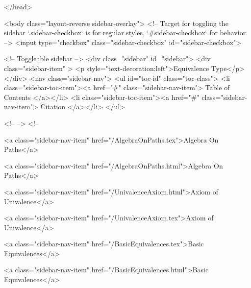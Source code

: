   
</head>




  <body class="layout-reverse sidebar-overlay">
    <!-- Target for toggling the sidebar `.sidebar-checkbox` is for regular
     styles, `#sidebar-checkbox` for behavior. -->
<input type="checkbox" class="sidebar-checkbox" id="sidebar-checkbox">

<!-- Toggleable sidebar -->
<div class="sidebar" id="sidebar">
  <div class="sidebar-item" >
    <p style="text-decoration:left">Equivalence Type</p>
  </div>
  <nav class="sidebar-nav">
    <ul id="toc-id" class="toc-class">
  <li class="sidebar-toc-item"><a href="#" class="sidebar-nav-item"> Table of Contents </a></li>
  <li class="sidebar-toc-item"><a href="#" class="sidebar-nav-item"> Citation </a></li>
</ul>


    <!--  -->
    <!-- 
      
    
      
    
      
    
      
    
      
        
      
    
      
        
          <a class="sidebar-nav-item" href="/AlgebraOnPaths.tex">Algebra On Paths</a>
        
      
    
      
        
          <a class="sidebar-nav-item" href="/AlgebraOnPaths.html">Algebra On Paths</a>
        
      
    
      
        
          <a class="sidebar-nav-item" href="/UnivalenceAxiom.html">Axiom of Univalence</a>
        
      
    
      
        
          <a class="sidebar-nav-item" href="/UnivalenceAxiom.tex">Axiom of Univalence</a>
        
      
    
      
        
          <a class="sidebar-nav-item" href="/BasicEquivalences.tex">Basic Equivalences</a>
        
      
    
      
        
          <a class="sidebar-nav-item" href="/BasicEquivalences.html">Basic Equivalences</a>
        
